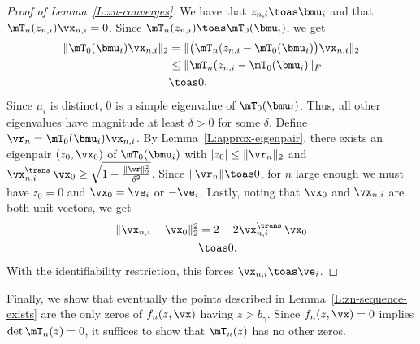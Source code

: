 \begin{proof}[Proof of Lemma~\ref{L:xn-converges}]
    We have that $z_{n,i} \toas \bmu_i$ and that
    $\mT_n(z_{n,i}) \vx_{n,i} = 0$.  Since
    $\mT_n(z_{n,i}) \toas \mT_0(\bmu_i)$, we get
    \begin{align*}
        \| \mT_0(\bmu_i) \vx_{n,i} \|_2
            &= \| \big(\mT_n(z_{n,i} - \mT_0(\bmu_i) \big) \vx_{n,i} \|_2 \\
            &\leq \| \mT_n(z_{n,i} - \mT_0(\bmu_i) \|_F \\
            &\toas 0.
    \end{align*}
    Since $\mu_i$ is distinct, $0$ is a simple eigenvalue of $\mT_0(\bmu_i)$.
    Thus, all other eigenvalues have magnitude at least $\delta > 0$ for some 
    $\delta$.
    Define $\vr_n = \mT_0(\bmu_i) \vx_{n,i}$.  By 
    Lemma~\ref{L:approx-eigenpair}, there exists an eigenpair $(z_0, \vx_0)$
    of $\mT_0(\bmu_i)$ with $| z_0 | \leq \| \vr_n \|_2$ and
    $ \vx_{n,i}^\trans \, \vx_0 \geq
        \sqrt{ 1 - \frac{\|\vr\|_2^2}{ \delta^2 } }$.  Since 
    $\|\vr_n\| \toas 0$, for $n$ large enough we must have $z_0 = 0$ and
    $\vx_0 = \ve_i$ or $-\ve_i$.  Lastly, noting that $\vx_0$ and $\vx_{n,i}$
    are both unit vectors, we get
    \begin{align*}
        \| \vx_{n,i} - \vx_0 \|_2^2
            &= 2 - 2 \vx_{n,i}^\trans \, \vx_0 \\
            &\toas 0.
    \end{align*}
    With the identifiability restriction, this forces $\vx_{n,i} \toas \ve_i$.
\end{proof}

Finally, we show that eventually the points described in Lemma~\ref{L:zn-sequence-exists} are the only zeros of $f_n(z, \vx)$ having
$z > b_\gamma$.  Since $f_n(z, \vx) = 0$ implies 
$\det \mT_n(z) = 0$, it suffices to show that $\mT_n(z)$ has no other
zeros.

